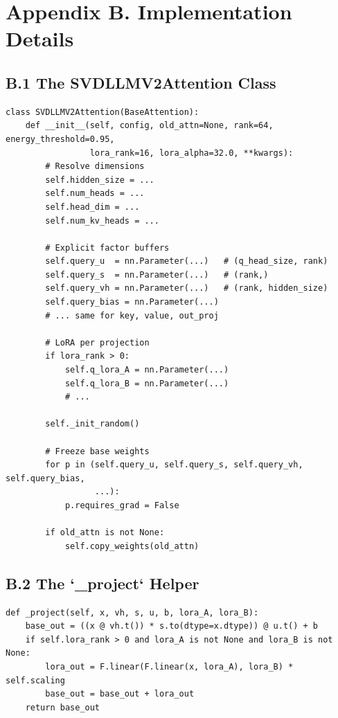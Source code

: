 
\section{Appendix B. Implementation Details}

\subsection{B.1 The SVDLLMV2Attention Class}

\begin{lstlisting}
class SVDLLMV2Attention(BaseAttention):
    def __init__(self, config, old_attn=None, rank=64, energy_threshold=0.95,
                 lora_rank=16, lora_alpha=32.0, **kwargs):
        # Resolve dimensions
        self.hidden_size = ...
        self.num_heads = ...
        self.head_dim = ...
        self.num_kv_heads = ...
        
        # Explicit factor buffers
        self.query_u  = nn.Parameter(...)   # (q_head_size, rank)
        self.query_s  = nn.Parameter(...)   # (rank,)
        self.query_vh = nn.Parameter(...)   # (rank, hidden_size)
        self.query_bias = nn.Parameter(...)
        # ... same for key, value, out_proj
        
        # LoRA per projection
        if lora_rank > 0:
            self.q_lora_A = nn.Parameter(...)
            self.q_lora_B = nn.Parameter(...)
            # ...
        
        self._init_random()
        
        # Freeze base weights
        for p in (self.query_u, self.query_s, self.query_vh, self.query_bias,
                  ...):
            p.requires_grad = False
        
        if old_attn is not None:
            self.copy_weights(old_attn)
\end{lstlisting}

\subsection{B.2 The `\_project` Helper}

\begin{lstlisting}
def _project(self, x, vh, s, u, b, lora_A, lora_B):
    base_out = ((x @ vh.t()) * s.to(dtype=x.dtype)) @ u.t() + b
    if self.lora_rank > 0 and lora_A is not None and lora_B is not None:
        lora_out = F.linear(F.linear(x, lora_A), lora_B) * self.scaling
        base_out = base_out + lora_out
    return base_out
\end{lstlisting}

